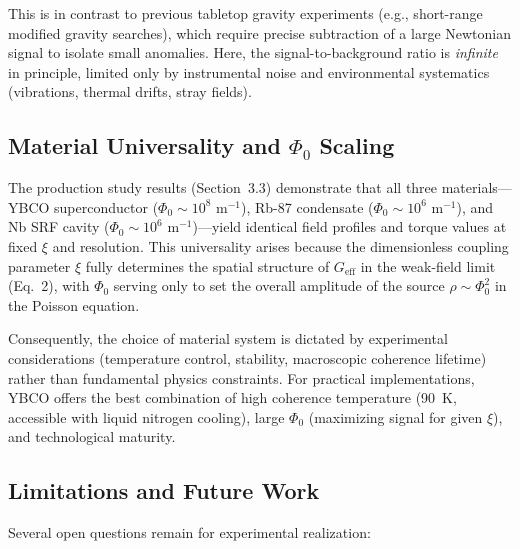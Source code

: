 \documentclass[10pt,twocolumn]{article}
\begin{document}
This is in contrast to previous tabletop gravity experiments (e.g., short-range modified gravity searches), which require precise subtraction of a large Newtonian signal to isolate small anomalies. Here, the signal-to-background ratio is \textit{infinite} in principle, limited only by instrumental noise and environmental systematics (vibrations, thermal drifts, stray fields).

\subsection{Material Universality and $\Phi_0$ Scaling}

The production study results (Section~3.3) demonstrate that all three materials---YBCO superconductor ($\Phi_0 \sim 10^8$ m$^{-1}$), Rb-87 condensate ($\Phi_0 \sim 10^6$ m$^{-1}$), and Nb SRF cavity ($\Phi_0 \sim 10^6$ m$^{-1}$)---yield identical field profiles and torque values at fixed $\xi$ and resolution. This universality arises because the dimensionless coupling parameter $\xi$ fully determines the spatial structure of $G_{\text{eff}}$ in the weak-field limit (Eq.~2), with $\Phi_0$ serving only to set the overall amplitude of the source $\rho \sim \Phi_0^2$ in the Poisson equation.

Consequently, the choice of material system is dictated by experimental considerations (temperature control, stability, macroscopic coherence lifetime) rather than fundamental physics constraints. For practical implementations, YBCO offers the best combination of high coherence temperature (90~K, accessible with liquid nitrogen cooling), large $\Phi_0$ (maximizing signal for given $\xi$), and technological maturity.

\subsection{Limitations and Future Work}

Several open questions remain for experimental realization:
\end{document}
